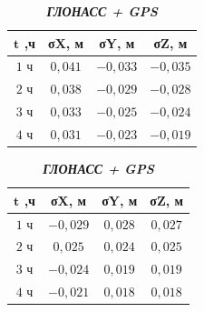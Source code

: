 \begin{table} [htbp]
	\centering\small
	\label{tab:tab19}{%
			\hfill
			\begin{subtable}{.33\linewidth}	
				\centering
				\caption*{\textbf{\textit{GPS}}}
				\begin{tabular}{|c|c|c|c|}
					\hline
					$\mathbf{t}$ \textbf{,ч}   & \textbf{σX, м}    & \textbf{σY, м}  & \textbf{σZ, м}  \\ \hline
					$1$ ч                      & $ 0,041$          & $-0,033$        & $-0,035$        \\ \hline
					$2$ ч                      & $ 0,038$          & $-0,029$        & $-0,028$        \\ \hline
					$3$ ч                      & $ 0,033$          & $-0,025$        & $-0,024$        \\ \hline
					$4$ ч	                   & $ 0,031$          & $-0,023$        & $-0,019$        \\ \hline
				\end{tabular}
			\end{subtable}%
			\qquad
			\begin{subtable}{.33\linewidth}	
				\centering
				\caption*{\textbf{\textit{ГЛОНАСС + GPS}}}
				\begin{tabular}{|c|c|c|c|}
					\hline
					$\mathbf{t}$ \textbf{,ч}   & \textbf{σX, м}    & \textbf{σY, м}  & \textbf{σZ, м}  \\ \hline
					$1$ ч                      & $-0,029$          & $ 0,028$        & $ 0,027$        \\ \hline
					$2$ ч                      & $ 0,025$          & $ 0,024$        & $ 0,025$        \\ \hline
					$3$ ч                      & $-0,024$          & $ 0,019$        & $ 0,019$        \\ \hline
					$4$ ч	                   & $-0,021$          & $ 0,018$        & $ 0,018$        \\ \hline
				\end{tabular}
			\end{subtable}\hfill%
	}
\end{table}
	

